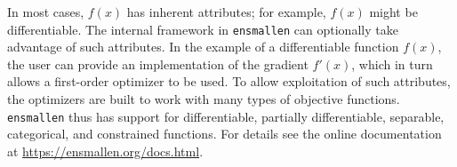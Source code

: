\documentclass[twoside,11pt]{article}
\begin{document}
In most cases, $f(x)$ has inherent attributes;
for example, $f(x)$ might be differentiable.
The internal framework in {\tt ensmallen} can optionally take advantage of such attributes.
In the example of a differentiable function $f(x)$,
the user can provide an implementation of the gradient $f'(x)$,
which in turn allows a first-order optimizer to be used.
To allow exploitation of such attributes, the optimizers are built to work with
many types of objective functions.  {\tt ensmallen} thus has support for
differentiable, partially differentiable, separable, categorical,
and constrained functions.  For details
see the online documentation at \mbox{\url{https://ensmallen.org/docs.html}}.

% 
% 
% 
% 
% 
\end{document}
